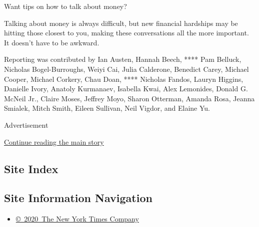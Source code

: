 Want tips on how to talk about money?

Talking about money is always difficult, but new financial hardships may
be hitting those closest to you, making these conversations all the more
important. It doesn't have to be awkward.

Reporting was contributed by Ian Austen, Hannah Beech, **** Pam Belluck,
Nicholas Bogel-Burroughs, Weiyi Cai, Julia Calderone, Benedict Carey,
Michael Cooper, Michael Corkery, Chau Doan, **** Nicholas Fandos, Lauryn
Higgins, Danielle Ivory, Anatoly Kurmanaev, Isabella Kwai, Alex
Lemonides, Donald G. McNeil Jr., Claire Moses, Jeffrey Moyo, Sharon
Otterman, Amanda Rosa, Jeanna Smialek, Mitch Smith, Eileen Sullivan,
Neil Vigdor, and Elaine Yu.

Advertisement

\protect\hyperlink{after-bottom}{Continue reading the main story}

\hypertarget{site-index}{%
\subsection{Site Index}\label{site-index}}

\hypertarget{site-information-navigation}{%
\subsection{Site Information
Navigation}\label{site-information-navigation}}

\begin{itemize}
\tightlist
\item
  \href{https://help.nytimes3xbfgragh.onion/hc/en-us/articles/115014792127-Copyright-notice}{©~2020~The
  New York Times Company}
\end{itemize}

